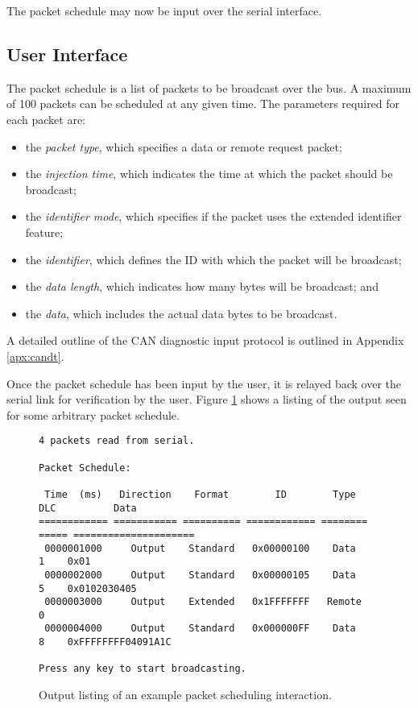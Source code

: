 The packet schedule may now be input over the serial interface.

\subsection{User Interface}
\label{ref:candt_ui}

The packet schedule is a list of packets to be broadcast over the bus. A maximum of 100 packets can be scheduled at any given time. The parameters required for each packet are:

\begin{itemize}
	\item the \emph{packet type}, which specifies a data or remote request packet;
	\item the \emph{injection time}, which indicates the time at which the packet should be broadcast;
	\item the \emph{identifier mode}, which specifies if the packet uses the extended identifier feature;
	\item the \emph{identifier}, which defines the ID with which the packet will be broadcast;
	\item the \emph{data length}, which indicates how many bytes will be broadcast; and
	\item the \emph{data}, which includes the actual data bytes to be broadcast.
\end{itemize}

A detailed outline of the CAN diagnostic input protocol is outlined in Appendix \ref{apx:candt}. 

Once the packet schedule has been input by the user, it is relayed back over the serial link for verification by the user. Figure \ref{fig:candt_sched} shows a listing of the output seen for some arbitrary packet schedule.

\begin{figure}[H]
	\centering
	\makebox[\textwidth]{\hrulefill}
{\footnotesize	
	\begin{verbatim}
4 packets read from serial.

Packet Schedule:

 Time  (ms)   Direction    Format        ID        Type    DLC          Data                  
============ =========== ========== ============ ======== ===== =====================
 0000001000     Output    Standard   0x00000100    Data     1    0x01 
 0000002000     Output    Standard   0x00000105    Data     5    0x0102030405
 0000003000     Output    Extended   0x1FFFFFFF   Remote    0    
 0000004000     Output    Standard   0x000000FF    Data     8    0xFFFFFFFF04091A1C    
 
Press any key to start broadcasting.
	\end{verbatim}
}	
	\makebox[\textwidth]{\hrulefill}
	\caption{Output listing of an example packet scheduling interaction.}
	\label{fig:candt_sched}
\end{figure}

